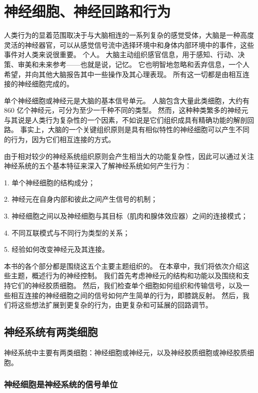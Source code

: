 \chapter{神经细胞、神经回路和行为} \label{chap:chap3}

人类行为的显着范围取决于与大脑相连的一系列复杂的感觉受体，大脑是一种高度灵活的神经器官，可以从感觉信号流中选择环境中和身体内部环境中的事件，这些事件对人类来说很重要。 个人。 
大脑主动组织感官信息，用于感知、行动、决策、审美和未来参考——也就是说，记忆。 
它也明智地忽略和丢弃信息，一个人希望，并向其他大脑报告其中一些操作及其心理表现。 
所有这一切都是由相互连接的神经细胞完成的。


单个神经细胞或神经元是大脑的基本信号单元。 
人脑包含大量此类细胞，大约有 860 亿个神经元，可分为至少一千种不同的类型。 
然而，这种种类繁多的神经元与其说是人类行为复杂性的一个因素，不如说是它们组织成具有精确功能的解剖回路。 
事实上，大脑的一个关键组织原则是具有相似特性的神经细胞可以产生不同的行为，因为它们相互连接的方式。


由于相对较少的神经系统组织原则会产生相当大的功能复杂性，因此可以通过关注神经系统的五个基本特征来深入了解神经系统如何产生行为：

1. 单个神经细胞的结构成分；

2. 神经元在自身内部和彼此之间产生信号的机制；

3. 神经细胞之间以及神经细胞与其目标（肌肉和腺体效应器）之间的连接模式；

4. 不同互联模式与不同行为类型的关系；

5. 经验如何改变神经元及其连接。

本书的各个部分都是围绕这五个主要主题组织的。 
在本章中，我们将依次介绍这些主题，概述行为的神经控制。 
我们首先考虑神经元的结构和功能以及围绕和支持它们的神经胶质细胞。 
然后，我们检查单个细胞如何组织和传输信号，以及一些相互连接的神经细胞之间的信号如何产生简单的行为，即膝跳反射。 
然后，我们将这些想法扩展到更复杂的行为，由更复杂和可延展的回路调节。


\section{神经系统有两类细胞}

神经系统中主要有两类细胞：神经细胞或神经元，以及神经胶质细胞或神经胶质细胞。

\subsection{神经细胞是神经系统的信号单位}

